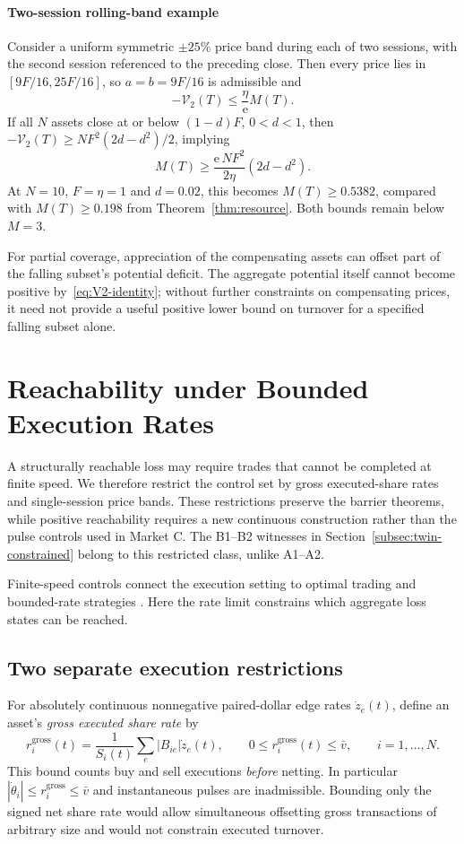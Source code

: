 \documentclass[review,hidelinks,onefignum,onetabnum]{siamonline250211}
\begin{document}
\paragraph{Two-session rolling-band example}
Consider a uniform symmetric $\pm25\%$ price band during each of two
sessions, with the second session referenced to the preceding close.
Then every price lies in
$[9F/16,25F/16]$, so $a=b=9F/16$ is admissible and
\[
-\mathcal V_2(T)\le\frac{\eta}{\mathrm e}M(T).
\]
If all $N$ assets close at or below $(1-d)F$, $0<d<1$, then
$-\mathcal V_2(T)\ge NF^2(2d-d^2)/2$, implying
\[
M(T)\ge\frac{\mathrm e\,NF^2}{2\eta}(2d-d^2).
\]
At $N=10$, $F=\eta=1$ and $d=0.02$, this becomes
$M(T)\ge0.5382$, compared with $M(T)\ge0.198$ from
Theorem~\ref{thm:resource}. Both bounds remain below $M=3$.

For partial coverage, appreciation of the compensating assets can
offset part of the falling subset's potential deficit. The aggregate
potential itself cannot become positive by~\eqref{eq:V2-identity};
without further constraints on compensating prices, it need not
provide a useful positive lower bound on turnover for a specified
falling subset alone.


\section{Reachability under Bounded Execution Rates}\label{sec:rateband}
A structurally reachable loss may require trades that cannot be
completed at finite speed. We therefore restrict the control set
by gross executed-share rates and single-session price bands.
These restrictions preserve the barrier theorems, while
positive reachability requires a new continuous construction
rather than the pulse controls used in Market C. The
B1--B2 witnesses in Section~\ref{subsec:twin-constrained}
belong to this restricted class, unlike A1--A2.

Finite-speed controls connect the execution setting to optimal trading and bounded-rate strategies \citep{AlmgrenChriss2001,Yang2019}. Here the rate limit constrains which aggregate loss states can be reached.

\subsection{Two separate execution restrictions}\label{subsec:execution-restrictions}
For absolutely continuous nonnegative paired-dollar edge rates $\dot z_e(t)$, define an asset's \emph{gross executed share rate} by
\begin{equation}\label{eq:grossrate}
 r_i^{\mathrm{gross}}(t)=\frac{1}{S_i(t)}\sum_e |B_{ie}|\dot z_e(t),\qquad
 0\le r_i^{\mathrm{gross}}(t)\le\bar v,\qquad i=1,\ldots,N.
\end{equation}
This bound counts buy and sell executions \emph{before} netting. In particular $|\dot\theta_i|\le r_i^{\mathrm{gross}}\le\bar v$ and instantaneous pulses are inadmissible. Bounding only the signed net share rate would allow simultaneous offsetting gross transactions of arbitrary size and would not constrain executed turnover.
\end{document}
